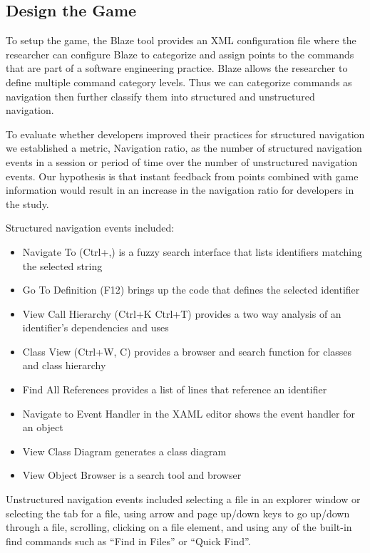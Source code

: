 \documentclass{sig-alternate}
\begin{document}
\subsection{Design the Game}

To setup the game, the Blaze tool provides an XML configuration file where the researcher can configure Blaze to categorize and assign points to the commands that are part of a software engineering practice.  Blaze allows the researcher to define multiple command category levels.  Thus we can categorize commands as navigation then further classify them into structured and unstructured navigation.  

To evaluate whether developers improved their practices for structured navigation we established a metric, Navigation ratio, as the number of structured navigation events in a session or period of time over the number of unstructured navigation events.  Our hypothesis is that instant feedback from points combined with game information would result in an increase in the navigation ratio for developers in the study.

Structured navigation events included: 
\begin{itemize}[itemsep=0mm]
\item Navigate To (Ctrl+,) is a fuzzy search interface that lists identifiers matching the selected string 
\item Go To Definition (F12) brings up the code that defines the selected identifier 
\item View Call Hierarchy (Ctrl+K Ctrl+T) provides a two way analysis of an identifier's dependencies and uses
\item Class View (Ctrl+W, C) provides a browser and search function for classes and class hierarchy
\item Find All References provides a list of lines that reference an identifier
\item Navigate to Event Handler in the XAML editor shows the event handler for an object
\item View Class Diagram generates a class diagram 
\item View Object Browser is a search tool and browser
\end{itemize}

Unstructured navigation events included selecting a file in an explorer window or selecting the tab for a file, using arrow and page up/down keys to go up/down through a file, scrolling, clicking on a file element, and using any of the built-in find commands such as ``Find in Files'' or ``Quick Find''.
\end{document}
